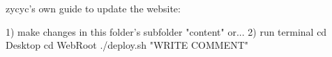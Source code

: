 zycyc's own guide to update the website:

1) make changes in this folder's subfolder "content" or...
2) run terminal
	cd Desktop
	cd WebRoot
	./deploy.sh "WRITE COMMENT"